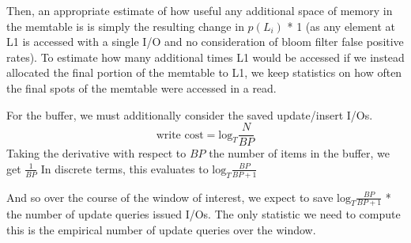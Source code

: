 \documentclass{sig-alternate-05-2015}
\begin{document}
Then, an appropriate estimate of how useful any additional space of memory in the memtable is is simply the resulting change in $p(L_i)$ * 1 (as any element at L1 is accessed with a single I/O and no consideration of bloom filter false positive rates). To estimate how many additional times L1 would be accessed if we instead allocated the final portion of the memtable to L1, we keep statistics on how often the final spots of the memtable were accessed in a read.

For the buffer, we must additionally consider the saved update/insert I/Os. 
$$
 \text{write cost} = \textrm{log}_{T} \frac{N}{BP}
$$
Taking the derivative with respect to $BP$ the number of items in the buffer, we get $\frac{1}{BP}$
In discrete terms, this evaluates to $\textrm{log}_{T} \frac{BP}{BP+1}$

And so over the course of the window of interest, we expect to save $\textrm{log}_{T} \frac{BP}{BP+1}$ * the number of update queries issued I/Os. The only statistic we need to compute this is the empirical number of update queries over the window.
%
%
\end{document}
